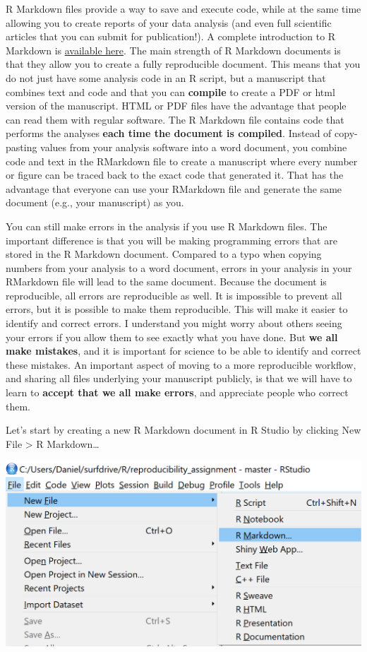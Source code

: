 \documentclass[
  oneside]{book}
\begin{document}
R Markdown files provide a way to save and execute code, while at the same time
allowing you to create reports of your data analysis (and even full scientific
articles that you can submit for publication!). A complete introduction to R
Markdown is \href{https://rmarkdown.rstudio.com/lesson-1.html}{available here}. The
main strength of R Markdown documents is that they allow you to create a fully
reproducible document. This means that you do not just have some analysis code
in an R script, but a manuscript that combines text and code and that you can
\textbf{compile} to create a PDF or html version of the manuscript. HTML or PDF files
have the advantage that people can read them with regular software. The R
Markdown file contains code that performs the analyses \textbf{each time the document
is compiled}. Instead of copy-pasting values from your analysis software into a
word document, you combine code and text in the RMarkdown file to create a
manuscript where every number or figure can be traced back to the exact code
that generated it. That has the advantage that everyone can use your RMarkdown
file and generate the same document (e.g., your manuscript) as you.

You can still make errors in the analysis if you use R Markdown files. The
important difference is that you will be making programming errors that are
stored in the R Markdown document. Compared to a typo when copying numbers from
your analysis to a word document, errors in your analysis in your RMarkdown file
will lead to the same document. Because the document is reproducible, all errors
are reproducible as well. It is impossible to prevent all errors, but it is
possible to make them reproducible. This will make it easier to identify and
correct errors. I understand you might worry about others seeing your errors if
you allow them to see exactly what you have done. But \textbf{we all make mistakes},
and it is important for science to be able to identify and correct these
mistakes. An important aspect of moving to a more reproducible workflow, and
sharing all files underlying your manuscript publicly, is that we will have to
learn to \textbf{accept that we all make errors}, and appreciate people who correct
them.

Let's start by creating a new R Markdown document in R Studio by clicking New
File \textgreater{} R Markdown\ldots{}

\begin{center}\includegraphics[width=1\linewidth]{images/f13fad91521fb984d12577416fa1fa99} \end{center}
\end{document}
